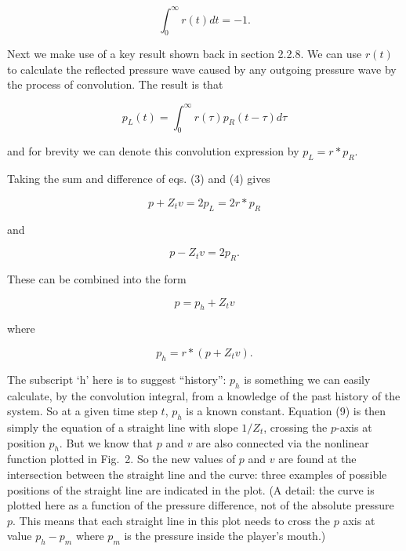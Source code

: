   \begin{equation*}\int_0^\infty{r(t) dt} =-1 . \tag{5}\end{equation*} 


  Next we make use of a key result shown back in section 2.2.8. We can use 
  $r(t)$ to calculate the reflected pressure wave caused by any outgoing 
  pressure wave by the process of convolution. The result is that 

  \begin{equation*}p_L(t)=\int_0^\infty{r(\tau) p_R(t-\tau) d \tau} 
  \tag{6}\end{equation*} 

  \noindent{}and for brevity we can denote this convolution expression by 
  $p_L=r*p_R$. 

  Taking the sum and difference of eqs. (3) and (4) gives 

  \begin{equation*}p+Z_t v=2 p_L=2r*p_R \tag{7}\end{equation*} 

  \noindent{}and 

  \begin{equation*}p-Z_t v=2p_R . \tag{8}\end{equation*} 

  These can be combined into the form 

  \begin{equation*}p=p_h + Z_t v \tag{9}\end{equation*} 

  \noindent{}where 

  \begin{equation*}p_h=r*(p+Z_t v). \tag{10}\end{equation*} 

  The subscript `h' here is to suggest ``history'': $p_h$ is something we can 
  easily calculate, by the convolution integral, from a knowledge of the past 
  history of the system. So at a given time step $t$, $p_h$ is a known 
  constant. Equation (9) is then simply the equation of a straight line with 
  slope $1/Z_t$, crossing the $p$-axis at position $p_h$. But we know that $p$ 
  and $v$ are also connected via the nonlinear function plotted in Fig.\ 2. So 
  the new values of $p$ and $v$ are found at the intersection between the 
  straight line and the curve: three examples of possible positions of the 
  straight line are indicated in the plot. (A detail: the curve is plotted here 
  as a function of the pressure difference, not of the absolute pressure $p$. 
  This means that each straight line in this plot needs to cross the $p$ axis 
  at value $p_h-p_m$ where $p_m$ is the pressure inside the player's mouth.) 

